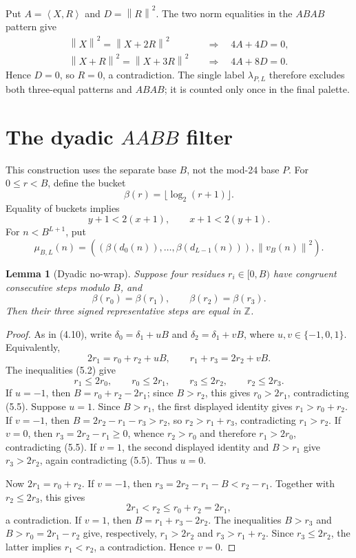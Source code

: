 \documentclass[11pt]{article}
\newtheorem{lemma}[theorem]{Lemma}
\theoremstyle{definition}
\newcommand{\Z}{\mathbb Z}
\newcommand{\norm}[1]{\left\lVert #1\right\rVert}
\newcommand{\ip}[2]{\left\langle #1,#2\right\rangle}
\begin{document}
Put \(A=\ip XR\) and \(D=\norm R^2\).  The two norm equalities in the
\(ABAB\) pattern give
\[
 \begin{aligned}
 \norm X^2=\norm{X+2R}^2&\quad\Longrightarrow\quad4A+4D=0,\\
 \norm{X+R}^2=\norm{X+3R}^2&\quad\Longrightarrow\quad4A+8D=0.
 \end{aligned}
 \tag{4.13}
\]
Hence \(D=0\), so \(R=0\), a contradiction.  The single label
\(\lambda_{P,L}\) therefore excludes both three-equal patterns and
\(ABAB\); it is counted only once in the final palette.

\section{The dyadic \(AABB\) filter}

This construction uses the separate base \(B\), not the mod-24 base \(P\).
For \(0\leq r<B\), define the bucket
\[
 \beta(r)=\lfloor\log_2(r+1)\rfloor.
 \tag{5.1}
\]
Equality of buckets implies
\[
 y+1<2(x+1),\qquad x+1<2(y+1).
 \tag{5.2}
\]
For \(n<B^{L+1}\), put
\[
 \mu_{B,L}(n)=
 \left(
   (\beta(d_0(n)),\ldots,\beta(d_{L-1}(n))),
   \norm{v_B(n)}^2
 \right).
 \tag{5.3}
\]

\begin{lemma}[Dyadic no-wrap]\label{lem:dyadic}
Suppose four residues \(r_i\in[0,B)\) have congruent consecutive steps
modulo \(B\), and
\[
 \beta(r_0)=\beta(r_1),\qquad
 \beta(r_2)=\beta(r_3).
 \tag{5.4}
\]
Then their three signed representative steps are equal in \(\Z\).
\end{lemma}

\begin{proof}
As in (4.10), write
\(\delta_0=\delta_1+uB\) and
\(\delta_2=\delta_1+vB\), where \(u,v\in\{-1,0,1\}\).
Equivalently,
\[
 2r_1=r_0+r_2+uB,
 \qquad
 r_1+r_3=2r_2+vB.
\]
The inequalities (5.2) give
\[
 r_1\leq2r_0,\qquad r_0\leq2r_1,\qquad
 r_3\leq2r_2,\qquad r_2\leq2r_3.
 \tag{5.5}
\]
If \(u=-1\), then \(B=r_0+r_2-2r_1\); since \(B>r_2\), this gives
\(r_0>2r_1\), contradicting (5.5).  Suppose \(u=1\).  Since \(B>r_1\),
the first displayed identity gives \(r_1>r_0+r_2\).  If \(v=-1\), then
\(B=2r_2-r_1-r_3>r_2\), so \(r_2>r_1+r_3\), contradicting
\(r_1>r_2\).  If \(v=0\), then \(r_3=2r_2-r_1\geq0\), whence
\(r_2>r_0\) and therefore \(r_1>2r_0\), contradicting (5.5).  If
\(v=1\), the second displayed identity and \(B>r_1\) give
\(r_3>2r_2\), again contradicting (5.5).  Thus \(u=0\).

Now \(2r_1=r_0+r_2\).  If \(v=-1\), then
\(r_3=2r_2-r_1-B<r_2-r_1\).  Together with \(r_2\leq2r_3\), this
gives
\[
 2r_1<r_2\leq r_0+r_2=2r_1,
\]
a contradiction.  If \(v=1\), then
\(B=r_1+r_3-2r_2\).  The inequalities \(B>r_3\) and
\(B>r_0=2r_1-r_2\) give, respectively,
\(r_1>2r_2\) and \(r_3>r_1+r_2\).  Since \(r_3\leq2r_2\), the latter
implies \(r_1<r_2\), a contradiction.  Hence \(v=0\).
\end{proof}
\end{document}
